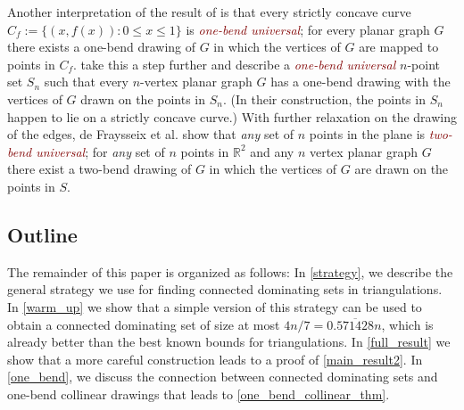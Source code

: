 \documentclass[a4paper,UKenglish,cleveref, autoref, thm-restate]{lipics-v2021}
\newcommand{\R}{\mathbb{R}}
\newcommand{\defin}[1]{\emph{\textcolor{Maroon}{#1}}}
\newcommand{\pat}[1]{[\textcolor{red}{PM: #1}]}
\begin{document}
Another interpretation of the result of \citet{DBLP:journals/comgeo/GiacomoDLW05} is that every strictly concave curve $C_f:=\{(x,f(x)):0\le x\le 1\}$ is \defin{one-bend universal}; for every planar graph $G$ there exists a one-bend drawing of $G$ in which the vertices of $G$ are mapped to points in $C_f$. \citet{DBLP:conf/gd/EverettLLW07} take this a step further and describe a \defin{one-bend universal} $n$-point set $S_n$ such that every $n$-vertex planar graph $G$ has a one-bend drawing with the vertices of $G$ drawn on the points in $S_n$. (In their construction, the points in $S_n$ happen to lie on a strictly concave curve.)
With further relaxation on the drawing of the edges, de Fraysseix et al. \cite{DBLP:journals/combinatorica/FraysseixPP90} show that \emph{any} set of $n$ points in the plane is \defin{two-bend universal}; for \emph{any} set of $n$ points in $\R^2$ and any $n$ vertex planar graph $G$ there exist a two-bend drawing of $G$ in which the vertices of $G$ are drawn on the points in $S$.


\subsection{Outline}

The remainder of this paper is organized as follows:  In \cref{strategy}, we describe the general strategy we use for finding connected dominating sets in triangulations.  In \cref{warm_up} we show that a simple version of this strategy can be used to obtain a connected dominating set of size at most $4n/7= 0.\overline{571428}n$, which is already better than the best known bounds for triangulations.  In \cref{full_result} we show that a more careful construction leads to a proof of \cref{main_result2}.  In \cref{one_bend}, we discuss the connection between connected dominating sets and one-bend collinear drawings that leads to \cref{one_bend_collinear_thm}.



%
\end{document}
